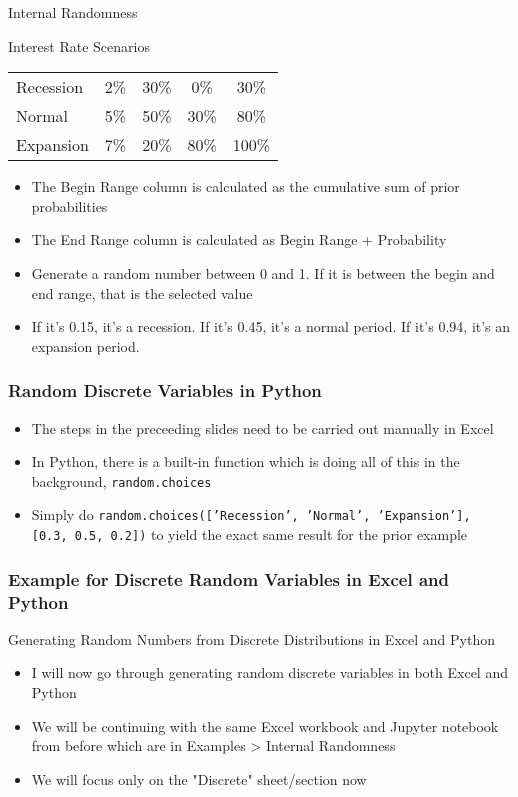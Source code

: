 \documentclass[handout, 11pt]{beamer}
\begin{document}
\begin{section}{Internal Randomness}
\begin{frame}
\begin{block}{Interest Rate Scenarios}
\begin{center}
\begin{tabular}{L{2cm}|cccc}
\midrule
Recession & 2\% & 30\% & 0\% & 30\%\\
Normal & 5\% & 50\% & 30\% & 80\%\\
Expansion & 7\% & 20\% & 80\% & 100\%\\

\end{tabular}
\end{center}
\end{block}
\begin{itemize}
\footnotesize
\item The Begin Range column is calculated as the cumulative sum of prior probabilities
\vfill
\item The End Range column is calculated as Begin Range + Probability
\vfill
\item Generate a random number between 0 and 1. If it is between the begin and end range, that is the selected value
\vfill
\item If it's 0.15, it's a recession. If it's 0.45, it's a normal period. If it's 0.94, it's an expansion period.
\end{itemize}
\end{frame}
\begin{frame}
\frametitle{Random Discrete Variables in Python}
\begin{itemize}
\item The steps in the preceeding slides need to be carried out manually in Excel
\vfill
\item In Python, there is a built-in function which is doing all of this in the background,
\texttt{random.choices}
\vfill
\item Simply do
\texttt{random.choices(['Recession', 'Normal', 'Expansion'], [0.3, 0.5, 0.2])}
to yield the exact same result for the prior example
\end{itemize}
\end{frame}
\begin{frame}
\frametitle{Example for Discrete Random Variables in Excel and Python}
{
\begin{block}{Generating Random Numbers from Discrete Distributions in Excel and Python}
\begin{itemize}
\item I will now go through generating random discrete variables in both Excel and Python
\item We will be continuing with the same Excel workbook and Jupyter notebook from before which are in Examples > Internal Randomness
\item We will focus only on the "Discrete" sheet/section now

\end{itemize}
\end{block}}
\end{frame}
\end{section}
\end{document}
